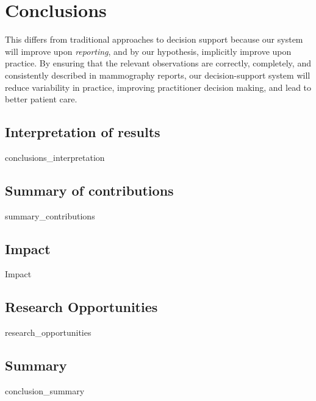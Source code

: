 \chapter{Conclusions}

This differs from traditional approaches to decision support because our system will improve upon \emph{reporting}, and by our hypothesis, implicitly improve upon practice. By ensuring that the relevant observations are correctly, completely, and consistently described in mammography reports, our decision-support system will reduce variability in practice, improving practitioner decision making, and lead to better patient care.


\section{Interpretation of results}
{conclusions_interpretation}

\section{Summary of contributions}
{summary_contributions}

\section{Impact}
{Impact}

\section{Research Opportunities}
{research_opportunities}

\section{Summary}
{conclusion_summary}